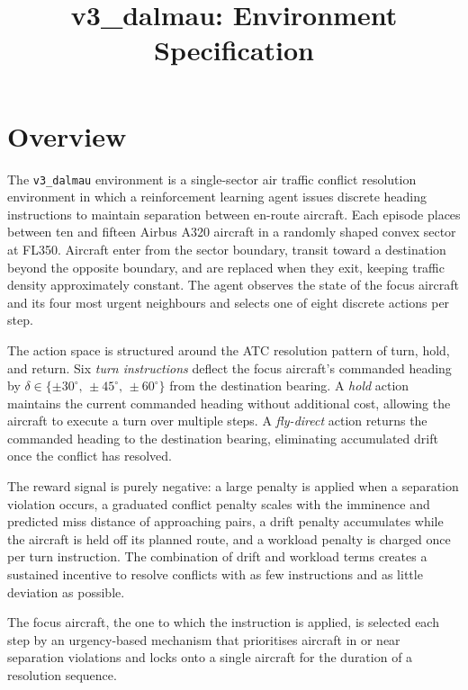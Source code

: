 \documentclass[11pt, a4paper]{article}
\title{\textbf{v3\_dalmau: Environment Specification}}
\author{}
\date{}
\begin{document}
\maketitle

\section{Overview}

The \texttt{v3\_dalmau} environment is a single-sector air traffic conflict
resolution environment in which a reinforcement learning agent issues discrete
heading instructions to maintain separation between en-route aircraft.
Each episode places between ten and fifteen Airbus A320 aircraft in a randomly
shaped convex sector at FL350.
Aircraft enter from the sector boundary, transit toward a destination beyond
the opposite boundary, and are replaced when they exit, keeping traffic density
approximately constant.
The agent observes the state of the focus aircraft and its four most urgent
neighbours and selects one of eight discrete actions per step.

The action space is structured around the ATC resolution pattern of turn,
hold, and return.
Six \textit{turn instructions} deflect the focus aircraft's commanded heading
by $\delta \in \{{\pm}30^\circ,\,{\pm}45^\circ,\,{\pm}60^\circ\}$ from the
destination bearing.
A \textit{hold} action maintains the current commanded heading without
additional cost, allowing the aircraft to execute a turn over multiple steps.
A \textit{fly-direct} action returns the commanded heading to the destination
bearing, eliminating accumulated drift once the conflict has resolved.

The reward signal is purely negative: a large penalty is applied when a
separation violation occurs, a graduated conflict penalty scales with the
imminence and predicted miss distance of approaching pairs, a drift penalty
accumulates while the aircraft is held off its planned route, and a workload
penalty is charged once per turn instruction.
The combination of drift and workload terms creates a sustained incentive to
resolve conflicts with as few instructions and as little deviation as possible.

The focus aircraft, the one to which the instruction is applied, is selected
each step by an urgency-based mechanism that prioritises aircraft in or near
separation violations and locks onto a single aircraft for the duration of a
resolution sequence.
\end{document}
